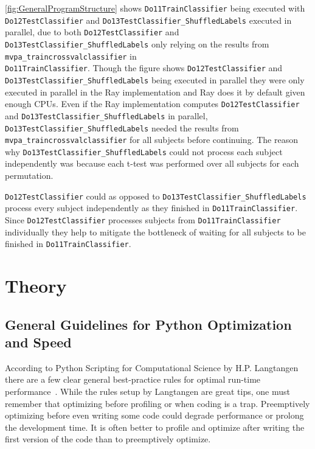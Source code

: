 \documentclass[12pt, a4paper]{article}
\begin{document}

\cref{fig:GeneralProgramStructure} shows \texttt{Do11TrainClassifier} being executed with \texttt{Do12TestClassifier} and \texttt{Do13TestClassifier\_ShuffledLabels} executed in parallel, due to both \texttt{Do12TestClassifier} and \texttt{Do13TestClassifier\_ShuffledLabels} only relying on the results from \texttt{mvpa\_traincrossvalclassifier} in\\
\texttt{Do11TrainClassifier}.
Though the figure shows \texttt{Do12TestClassifier} and \texttt{Do13TestClassifier\_ShuffledLabels} being executed in parallel they were only executed in parallel in the Ray implementation and Ray does it by default given enough CPUs.
Even if the Ray implementation computes \texttt{Do12TestClassifier} and \texttt{Do13TestClassifier\_ShuffledLabels} in parallel, \texttt{Do13TestClassifier\_ShuffledLabels} needed the results from \texttt{mvpa\_traincrossvalclassifier} for all subjects before continuing.
The reason why \texttt{Do13TestClassifier\_ShuffledLabels} could not process each subject independently was because each t-test was performed over all subjects for each permutation.

\texttt{Do12TestClassifier} could as opposed to \texttt{Do13TestClassifier\_ShuffledLabels} process every subject independently as they finished in \texttt{Do11TrainClassifier}.
Since \texttt{Do12TestClassifier} processes subjects from \texttt{Do11TrainClassifier} individually they help to mitigate the bottleneck of waiting for all subjects to be finished in \texttt{Do11TrainClassifier}.
 

\section{Theory}

\subsection{General Guidelines for Python Optimization and Speed}

According to Python Scripting for Computational Science by H.P. Langtangen there are a few clear general best-practice rules for optimal run-time performance~\cite{pythonBook}.
While the rules setup by Langtangen are great tips, one must remember that optimizing before profiling or when coding is a trap.
Preemptively optimizing before even writing some code could degrade performance or prolong the development time.
It is often better to profile and optimize after writing the first version of the code than to preemptively optimize.
\end{document}

